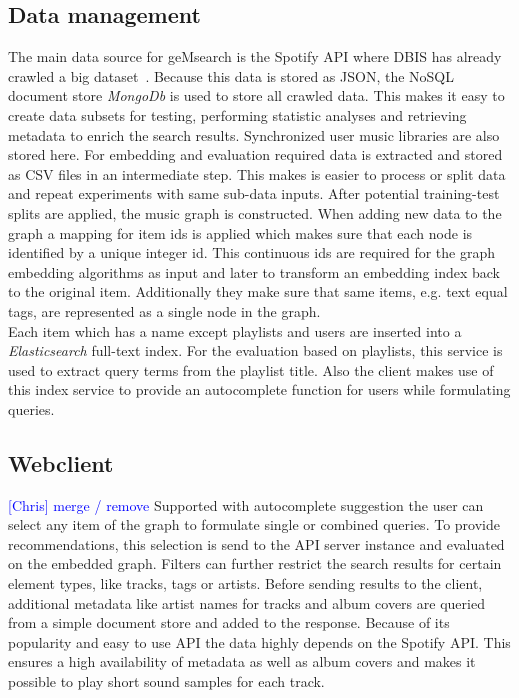\documentclass[sigconf]{acmart}
\newcommand{\ce}[1]{\textcolor{blue}{[Chris] #1}}
\newcommand{\ce}[1]{}
\begin{document}
\subsection{Data management}
The main data source for geMsearch is the Spotify API where DBIS has already crawled a big dataset~\cite{pichl2017improving}. Because this data is stored as JSON, the NoSQL document store \emph{MongoDb} is used to store all crawled data. This makes it easy to create data subsets for testing, performing statistic analyses and retrieving metadata to enrich the search results. Synchronized user music libraries are also stored here.
For embedding and evaluation required data is extracted and stored as CSV files in an intermediate step. This makes is easier to process or split data and repeat experiments with same sub-data inputs. After potential training-test splits are applied, the music graph is constructed. When adding new data to the graph a mapping for item ids is applied which makes sure that each node is identified by a unique integer id. This continuous ids are required for the graph embedding algorithms as input and later to transform an embedding index back to the original item. Additionally they make sure that same items, e.g. text equal tags, are represented as a single node in the graph. \\

Each item which has a name except playlists and users are inserted into a \emph{Elasticsearch} full-text index. For the evaluation based on playlists, this service is used to extract query terms from the playlist title. Also the client makes use of this index service to provide an autocomplete function for users while formulating queries.

\subsection{Webclient}
\ce{merge / remove}
Supported with autocomplete suggestion the user can select any item of the graph to formulate single or combined queries. To provide recommendations, this selection is send to the API server instance and evaluated on the embedded graph. Filters can further restrict the search results for certain element types, like tracks, tags or artists. Before sending results to the client, additional metadata like artist names for tracks and album covers are queried from a simple document store and added to the response. Because of its popularity and easy to use API the data highly depends on the Spotify API. This ensures a high availability of metadata as well as album covers and makes it possible to play short sound samples for each track.\\
\end{document}
